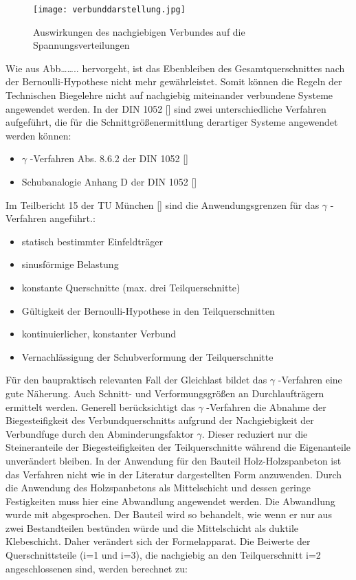 \documentclass[12 pt,a4 paper ]{scrreprt}
\begin{document}
\begin{figure}
\begin{center}
\texttt{[image: verbunddarstellung.jpg]}
\caption{Auswirkungen des nachgiebigen Verbundes auf die Spannungsverteilungen}
\label{verbunddastellung}
\end{center}
\end{figure}

Wie aus Abb…….. hervorgeht, ist das Ebenbleiben des Gesamtquerschnittes nach der Bernoulli-Hypothese nicht mehr gewährleistet. Somit können die Regeln der Technischen Biegelehre nicht auf nachgiebig miteinander verbundene Systeme angewendet werden. In der DIN 1052 [] sind zwei unterschiedliche Verfahren aufgeführt, die für die Schnittgrößenermittlung derartiger Systeme angewendet werden können:

\begin{itemize}
\item $\gamma$ -Verfahren Abs. 8.6.2 der DIN 1052 []
\item Schubanalogie Anhang D der DIN 1052 []
\end{itemize}



Im Teilbericht 15 der TU München [] sind die Anwendungsgrenzen für das  $\gamma$ -Verfahren angeführt.:
\begin{itemize}

\item statisch bestimmter Einfeldträger
\item sinusförmige Belastung
\item konstante Querschnitte (max. drei Teilquerschnitte)
\item Gültigkeit der Bernoulli-Hypothese in den Teilquerschnitten
\item kontinuierlicher, konstanter Verbund
\item Vernachlässigung der Schubverformung der Teilquerschnitte
\end{itemize}

Für den baupraktisch relevanten Fall der Gleichlast bildet das $\gamma$ -Verfahren eine gute Näherung. Auch Schnitt- und Verformungsgrößen an Durchlaufträgern ermittelt werden.
Generell berücksichtigt das $\gamma$ -Verfahren die Abnahme der Biegesteifigkeit des Verbundquerschnitts aufgrund der Nachgiebigkeit der Verbundfuge durch den Abminderungsfaktor $\gamma$. 
Dieser reduziert nur die Steineranteile der Biegesteifigkeiten der Teilquerschnitte während die Eigenanteile unverändert bleiben.
In der Anwendung für den Bauteil Holz-Holzspanbeton ist das Verfahren nicht wie in der Literatur dargestellten Form anzuwenden. Durch die Anwendung des Holzspanbetons als Mittelschicht und dessen geringe Festigkeiten muss hier eine Abwandlung angewendet werden. Die Abwandlung wurde mit abgesprochen.
Der Bauteil wird so behandelt, wie wenn er nur aus zwei Bestandteilen bestünden würde und die Mittelschicht als duktile Klebeschicht. Daher verändert sich der Formelapparat.
Die Beiwerte der Querschnittsteile (i=1 und i=3), die nachgiebig an den Teilquerschnitt i=2 angeschlossenen sind, werden berechnet zu: 
\end{document}
